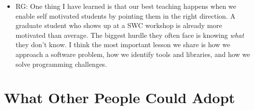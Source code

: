 \documentclass{article}
\begin{document}
\begin{itemize}
  \item RG: One thing I have learned is that our best teaching happens
    when we enable self motivated students by pointing them in the
    right direction. A graduate student who shows up at a SWC workshop
    is already more motivated than average. The biggest hurdle they
    often face is knowing \emph{what} they don't know. I think the
    most important lesson we share is how we approach a software
    problem, how we identify tools and libraries, and how we solve
    programming challenges.

\end{itemize}

\section{What Other People Could Adopt}
\end{document}
